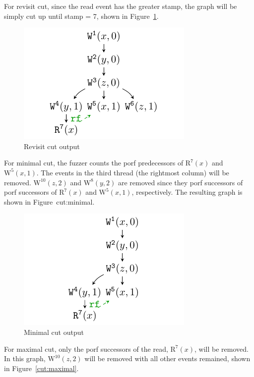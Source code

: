 For revisit cut, since the read event has the greater stamp, the graph will be simply cut up until stamp = 7, shown in Figure~\ref{cut:revisit}.

\begin{figure}[htbp] 
	\centering
	\includegraphics[scale=1]{figure/cuts/cut-revisit.pdf} 
	\caption{Revisit cut output} 
	\label{cut:revisit} 
\end{figure} 

For minimal cut, the fuzzer counts the porf predecessors of $\text{R}^7(x)$ and $\text{W}^5(x, 1)$. The events in the third thread (the rightmost column) will be removed. $\text{W}^{10}(z, 2)$ and $\text{W}^{8}(y, 2)$ are removed since they porf successors of porf successors of $\text{R}^7(x)$ and $\text{W}^5(x, 1)$, respectively. The resulting graph is shown in Figure~{cut:minimal}.

\begin{figure}[htbp] 
	\centering
	\includegraphics[scale=1]{figure/cuts/cut-minimal.pdf} 
	\caption{Minimal cut output} 
	\label{cut:minimal} 
\end{figure} 

For maximal cut, only the porf successors of the read, $\text{R}^7(x)$, will be removed. In this graph, $\text{W}^{10}(z, 2)$ will be removed with all other events remained, shown in Figure~\ref{cut:maximal}.

